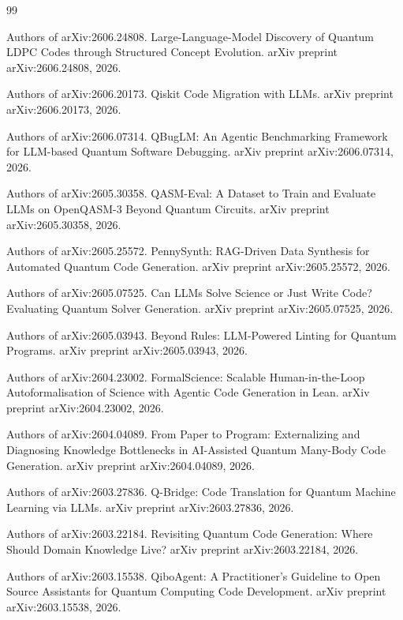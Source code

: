 \documentclass[11pt,a4paper]{article}
\begin{document}
\begin{thebibliography}{99}
\small

 Authors of arXiv:2606.24808. Large-Language-Model Discovery of Quantum LDPC Codes through Structured Concept Evolution. arXiv preprint arXiv:2606.24808, 2026.

 Authors of arXiv:2606.20173. Qiskit Code Migration with LLMs. arXiv preprint arXiv:2606.20173, 2026.

 Authors of arXiv:2606.07314. QBugLM: An Agentic Benchmarking Framework for LLM-based Quantum Software Debugging. arXiv preprint arXiv:2606.07314, 2026.

 Authors of arXiv:2605.30358. QASM-Eval: A Dataset to Train and Evaluate LLMs on OpenQASM-3 Beyond Quantum Circuits. arXiv preprint arXiv:2605.30358, 2026.

 Authors of arXiv:2605.25572. PennySynth: RAG-Driven Data Synthesis for Automated Quantum Code Generation. arXiv preprint arXiv:2605.25572, 2026.

 Authors of arXiv:2605.07525. Can LLMs Solve Science or Just Write Code? Evaluating Quantum Solver Generation. arXiv preprint arXiv:2605.07525, 2026.

 Authors of arXiv:2605.03943. Beyond Rules: LLM-Powered Linting for Quantum Programs. arXiv preprint arXiv:2605.03943, 2026.

 Authors of arXiv:2604.23002. FormalScience: Scalable Human-in-the-Loop Autoformalisation of Science with Agentic Code Generation in Lean. arXiv preprint arXiv:2604.23002, 2026.

 Authors of arXiv:2604.04089. From Paper to Program: Externalizing and Diagnosing Knowledge Bottlenecks in AI-Assisted Quantum Many-Body Code Generation. arXiv preprint arXiv:2604.04089, 2026.

 Authors of arXiv:2603.27836. Q-Bridge: Code Translation for Quantum Machine Learning via LLMs. arXiv preprint arXiv:2603.27836, 2026.

 Authors of arXiv:2603.22184. Revisiting Quantum Code Generation: Where Should Domain Knowledge Live? arXiv preprint arXiv:2603.22184, 2026.

 Authors of arXiv:2603.15538. QiboAgent: A Practitioner's Guideline to Open Source Assistants for Quantum Computing Code Development. arXiv preprint arXiv:2603.15538, 2026.


\end{thebibliography}
\end{document}
